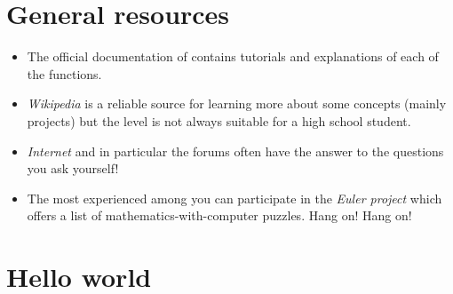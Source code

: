\documentclass[11pt,class=report,crop=false]{standalone}
\begin{document}


\section*{General resources}

\begin{itemize}

  \item The official documentation of \Python{} contains tutorials and explanations of each of the functions. 

  \item \emph{Wikipedia} is a reliable source for learning more about some concepts (mainly projects) but the level is not always suitable for a high school student.
  
  \item \emph{Internet} and in particular the forums often have the answer to the questions you ask yourself! 
  
  \item The most experienced among you can participate in the \emph{Euler project} which offers a list of mathematics-with-computer puzzles. Hang on! Hang on!  

\end{itemize}


\section{Hello world}
\end{document}
